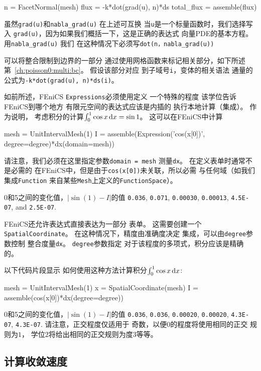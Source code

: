\begin{python}
n = FacetNormal(mesh)
flux = -k*dot(grad(u), n)*ds
total_flux = assemble(flux)
\end{python}
虽然\texttt{grad(u)}和\verb!nabla_grad(u)! 在上述可互换
当\texttt{u}是一个标量函数时，我们选择写入
\texttt{grad(u)}，因为如果我们概括一下，这是正确的表达式
向量PDE的基本方程。 用\verb!nabla_grad(u)! 我们
在这种情况下必须写\verb!dot(n，nabla_grad(u))!

可以将整合限制到边界的一部分
通过使用网格函数来标记相关部分，如下所述
第~\ref{ch:poisson0:multi:bc}。 假设该部分对应
到子域号\texttt{i}，变体的相关语法
通量的公式为\texttt{-k*dot(grad(u), n)*ds(i)}。


\begin{notice}[关于整合准确性的说明]
如前所述，FEniCS \texttt{Expressions}必须使用定义
一个特殊的程度 该学位告诉FEniCS到哪个地方
有限元空间的表达式应该是内插的
执行本地计算（集成）。 作为说明，
考虑积分的计算$\int_0^1 \cos x \, \mathrm{d}x = \sin
1$。 这可以在FEniCS中计算
\begin{python}
mesh = UnitIntervalMesh(1)
I = assemble(Expression('cos(x[0])', degree=degree)*dx(domain=mesh))
\end{python}
请注意，我们必须在这里指定参数\texttt{domain = mesh}
测量\texttt{dx}。 在定义表单时通常不是必需的
在FEniCS中，但是由于\texttt{cos(x[0])}未关联，所以必需
与任何域（如我们集成\texttt{Function}
来自某些\texttt{Mesh}上定义的\texttt{FunctionSpace}）。

0和5之间的变化值，$|\sin(1) - I|$的值
\texttt{0.036},
\texttt{0.071},
\texttt{0.00030},
\texttt{0.00013},
\texttt{4.5E-07}, and
\texttt{2.5E-07}.

FEniCS还允许表达式直接表达为一部分
表单。 这需要创建一个\texttt{SpatialCoordinate}。
在这种情况下，精度由准确度决定
集成，可以由\texttt{degree}参数控制
整合度量\texttt{dx}。 \texttt{degree}参数指定
对于该程度的多项式，积分应该是精确的。

以下代码片段显示
如何使用这种方法计算积分$\int_0^1 \cos x \, \mathrm{d}x$:
\begin{python}
mesh = UnitIntervalMesh(1)
x = SpatialCoordinate(mesh)
I = assemble(cos(x[0])*dx(degree=degree))
\end{python}
0和5之间的变化值，$|\sin(1) - I|$的值
\texttt{0.036},
\texttt{0.036},
\texttt{0.00020},
\texttt{0.00020},
\texttt{4.3E-07},
\texttt{4.3E-07}.
请注意，正交程度仅适用于
奇数，以便$0$的程度将使用相同的正交
规则为$1$，
学位$2$将给出相同的正交规则为度$3$等等。
\end{notice}

\subsection{计算收敛速度}
\label{ch:poisson0:convrates}

